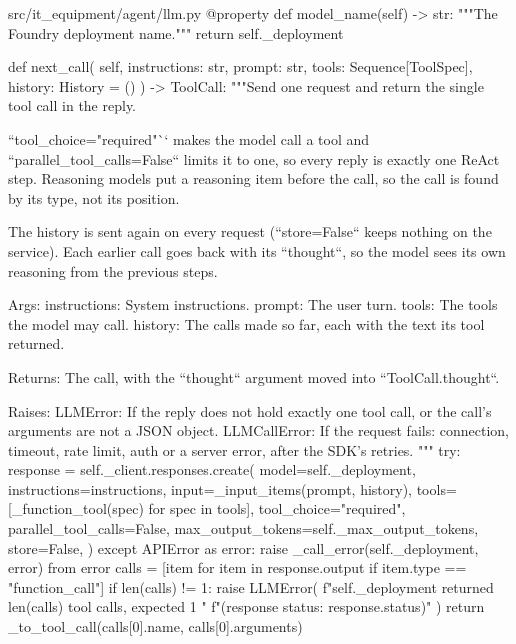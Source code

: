 \documentclass[11pt,letterpaper]{article}
\renewcommand{\_}{\textunderscore\allowbreak}
\begin{document}
\begin{codebox}{src/it_equipment/agent/llm.py}
    @property
    def model_name(self) -> str:
        """The Foundry deployment name."""
        return self._deployment

    def next_call(
        self, instructions: str, prompt: str, tools: Sequence[ToolSpec], history: History = ()
    ) -> ToolCall:
        """Send one request and return the single tool call in the reply.

        ``tool_choice="required"`` makes the model call a tool and ``parallel_tool_calls=False``
        limits it to one, so every reply is exactly one ReAct step. Reasoning models put a
        reasoning item before the call, so the call is found by its type, not its position.

        The history is sent again on every request (``store=False`` keeps nothing on the
        service). Each earlier call goes back with its ``thought``, so the model sees its own
        reasoning from the previous steps.

        Args:
            instructions: System instructions.
            prompt: The user turn.
            tools: The tools the model may call.
            history: The calls made so far, each with the text its tool returned.

        Returns:
            The call, with the ``thought`` argument moved into ``ToolCall.thought``.

        Raises:
            LLMError: If the reply does not hold exactly one tool call, or the call's
                arguments are not a JSON object.
            LLMCallError: If the request fails: connection, timeout, rate limit, auth or a
                server error, after the SDK's retries.
        """
        try:
            response = self._client.responses.create(
                model=self._deployment,
                instructions=instructions,
                input=_input_items(prompt, history),
                tools=[_function_tool(spec) for spec in tools],
                tool_choice="required",
                parallel_tool_calls=False,
                max_output_tokens=self._max_output_tokens,
                store=False,
            )
        except APIError as error:
            raise _call_error(self._deployment, error) from error
        calls = [item for item in response.output if item.type == "function_call"]
        if len(calls) != 1:
            raise LLMError(
                f"{self._deployment} returned {len(calls)} tool calls, expected 1 "
                f"(response status: {response.status})"
            )
        return _to_tool_call(calls[0].name, calls[0].arguments)



\end{codebox}
\end{document}

